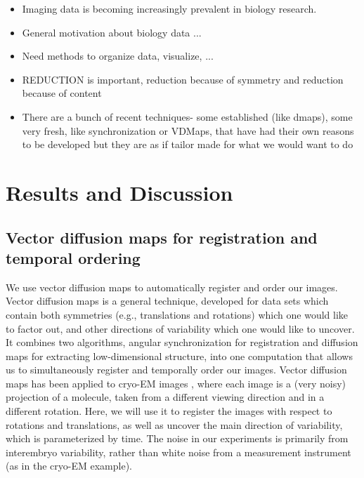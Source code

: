 \documentclass{pnastwo}
\begin{document}
\begin{article}
\begin{itemize}
\item Imaging data is becoming increasingly prevalent in biology research.
%
\item General motivation about biology data ...
%
\item Need methods to organize data, visualize, ...
%
\item REDUCTION is important, reduction because of symmetry and reduction because of content
%
\item There are a bunch of recent techniques- some established (like dmaps), some very fresh, like synchronization or VDMaps,  that have had their own reasons to be developed but they are as if tailor made for what we would want to do
\end{itemize}


\section{Results and Discussion}



\subsection{Vector diffusion maps for registration and temporal ordering}

We use vector diffusion maps \cite{singer2012vector} to automatically register and order our images.
%
Vector diffusion maps is a general technique, developed for data sets which contain both symmetries (e.g., translations and rotations) which one would like to factor out, and other directions of variability which one would like to uncover.
%
It combines two algorithms, angular synchronization \cite{singer2011angular} for registration and diffusion maps \cite{coifman2005geometric} for extracting low-dimensional structure, into one computation that allows us to simultaneously register and temporally order our images. 
%
Vector diffusion maps has been applied to cryo-EM images \cite{...}, where each image is a (very noisy) projection of a molecule, taken from a different viewing direction and in a different rotation. 
%
Here, we will use it to register the images with respect to rotations and translations, as well as uncover the main direction of variability, which is parameterized by time. 
%
The noise in our experiments is primarily from interembryo variability, rather than white noise from a measurement instrument (as in the cryo-EM example). 


\end{article}
\end{document}
